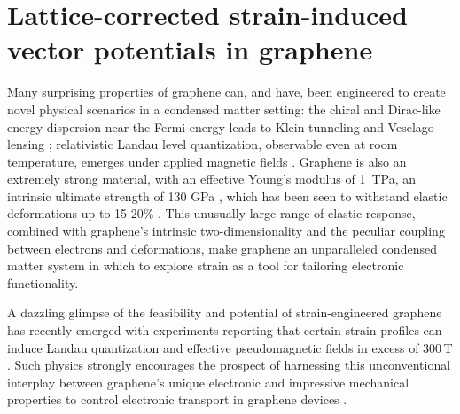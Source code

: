 \chapter{Lattice-corrected strain-induced vector potentials in graphene}

Many surprising properties of graphene can, and have, been engineered to create novel physical scenarios in a condensed matter setting: the chiral and Dirac-like energy dispersion near the Fermi energy leads to Klein tunneling \cite{Beenakker2008} and Veselago lensing \cite{Cheianov2007}; relativistic Landau level quantization, observable even at room temperature, emerges under applied magnetic fields \cite{Novoselov2007}.
Graphene is also an extremely strong material, with an effective Young's modulus of 1~TPa, an intrinsic ultimate strength of 130 GPa \cite{Lee2008}, which  has been seen to withstand elastic deformations up to 15-20\% \cite{Cadelano2009}.
This unusually large range of elastic response, combined with graphene's intrinsic two-dimensionality and the peculiar coupling between electrons and deformations, make graphene an unparalleled condensed matter system in which to explore strain as a tool for tailoring electronic functionality.

A dazzling glimpse of the feasibility and potential of strain-engineered graphene \cite{Pereira2009a,Guinea2009} has recently emerged with experiments reporting that certain strain profiles can induce Landau quantization and effective pseudomagnetic fields in excess of 300\,T \cite{Levy2010,Yan2012,Yeh2011}.
Such physics strongly encourages the prospect of harnessing this unconventional interplay between graphene's unique electronic and impressive mechanical properties to control electronic transport in graphene devices \cite{Pereira2009a,Fogler2008}.

